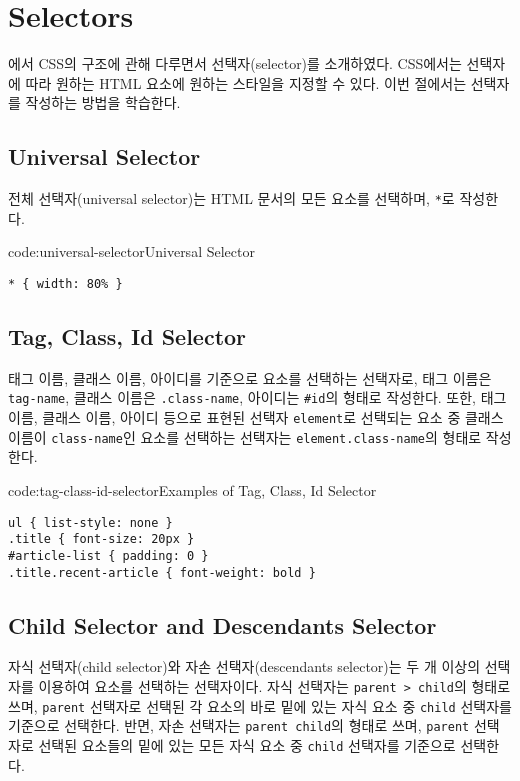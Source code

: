 \section{Selectors} \label{sect:selectors}

에서 CSS의 구조에 관해 다루면서 선택자(selector)를 소개하였다. CSS에서는 선택자에 따라 원하는 HTML 요소에 원하는 스타일을 지정할 수 있다. 이번 절에서는 선택자를 작성하는 방법을 학습한다.

\subsection*{Universal Selector}

전체 선택자(universal selector)는 HTML 문서의 모든 요소를 선택하며, \texttt{*}로 작성한다.

\begin{codeenv}{code:universal-selector}{Universal Selector}\begin{verbatim}
* { width: 80% }
\end{verbatim}
\end{codeenv}

\subsection*{Tag, Class, Id Selector}
태그 이름, 클래스 이름, 아이디를 기준으로 요소를 선택하는 선택자로, 태그 이름은 \texttt{tag-name}, 클래스 이름은 \texttt{.class-name}, 아이디는 \texttt{\#id}의 형태로 작성한다. 또한, 태그 이름, 클래스 이름, 아이디 등으로 표현된 선택자 \texttt{element}로 선택되는 요소 중 클래스 이름이 \texttt{class-name}인 요소를 선택하는 선택자는 \texttt{element.class-name}의 형태로 작성한다.

\begin{codeenv}{code:tag-class-id-selector}{Examples of Tag, Class, Id Selector}\begin{verbatim}
ul { list-style: none }
.title { font-size: 20px }
#article-list { padding: 0 }
.title.recent-article { font-weight: bold }
\end{verbatim}
\end{codeenv}

\subsection*{Child Selector and Descendants Selector}
자식 선택자(child selector)와 자손 선택자(descendants selector)는 두 개 이상의 선택자를 이용하여 요소를 선택하는 선택자이다. 자식 선택자는 \texttt{parent > child}의 형태로 쓰며, \texttt{parent} 선택자로 선택된 각 요소의 바로 밑에 있는 자식 요소 중 \texttt{child} 선택자를 기준으로 선택한다. 반면, 자손 선택자는 \texttt{parent child}의 형태로 쓰며, \texttt{parent} 선택자로 선택된 요소들의 밑에 있는 모든 자식 요소 중 \texttt{child} 선택자를 기준으로 선택한다.

